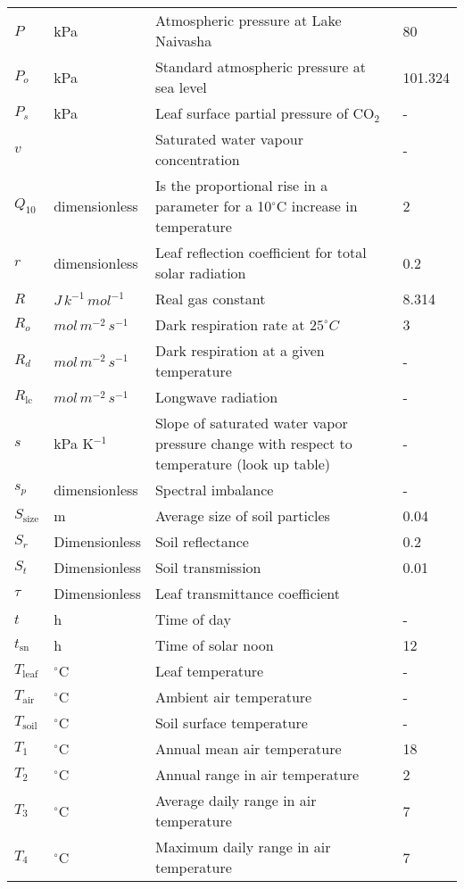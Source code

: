 \documentclass[12pt]{report}
\begin{document}
\begin{center}
\begin{longtable}{l l p{3in} p{0.5in}}
$P$	&	kPa	&	Atmospheric pressure at Lake Naivasha	&	80	\\
$P_o$	&	kPa	&	Standard atmospheric pressure at sea level	&	101.324	\\
$P_s$	&	kPa	&	Leaf surface partial pressure of CO$_2$ 	&	-	\\
$v$	&		&	Saturated water vapour concentration 	&	-	\\
$Q_{10}$	&	dimensionless	&	Is the proportional rise in a parameter for a 10$^\circ$C increase in temperature	&	2	\\
$r$	&	dimensionless	&	Leaf reflection coefficient for total solar radiation	&	0.2	\\
$R$	&	$J\, k^{-1}\, mol^{-1}$ 	&	Real gas constant	&	8.314	\\
$R_o$	&	$mol\, m^{-2}\, s^{-1}$ 	&	Dark respiration rate at $25^\circ C$	&	3	\\
$R_d$	&	$mol\, m^{-2}\, s^{-1}$ 	&	Dark respiration at a given temperature	&	-	\\
$R_{\text{lc}}$	&	$mol\, m^{-2}\, s^{-1}$ 	&	Longwave radiation	&	-	\\
$s$	&	kPa K$^{-1}$	&	Slope of saturated water vapor pressure change with respect to temperature (look up table)	&	-	\\
$s_p$	&	dimensionless	&	Spectral imbalance	&	-	\\
$S_{\text{size}}$	&	m	&	Average size of soil particles	&	0.04	\\
$S_r$	&	Dimensionless	&	Soil reflectance	&	0.2	\\
$S_t$	&	Dimensionless 	&	Soil transmission	&	0.01	\\
$\tau$	&	Dimensionless 	&	Leaf transmittance coefficient	&		\\
$t$	&	h	&	Time of day	&	-	\\
$t_{\text{sn}}$	&	h	&	Time of solar noon	&	12	\\
$T_{\text{leaf}}$	&	$^\circ$C	&	Leaf temperature	&	-	\\
$T_{\text{air}}$	&	$^\circ$C	&	Ambient air temperature	&	-	\\
$T_{\text{soil}}$	&	$^\circ$C	&	Soil surface temperature	&	-	\\
$T_1$	&	$^\circ$C	&	Annual mean air temperature	&	18	\\
$T_2$	&	$^\circ$C	&	Annual range in air temperature	&	2	\\
$T_3$	&	$^\circ$C	&	Average daily range in air temperature	&	7	\\
$T_4$	&	$^\circ$C	&	Maximum daily range in air temperature	&	7	\\

\end{longtable}
\end{center}
\end{document}
